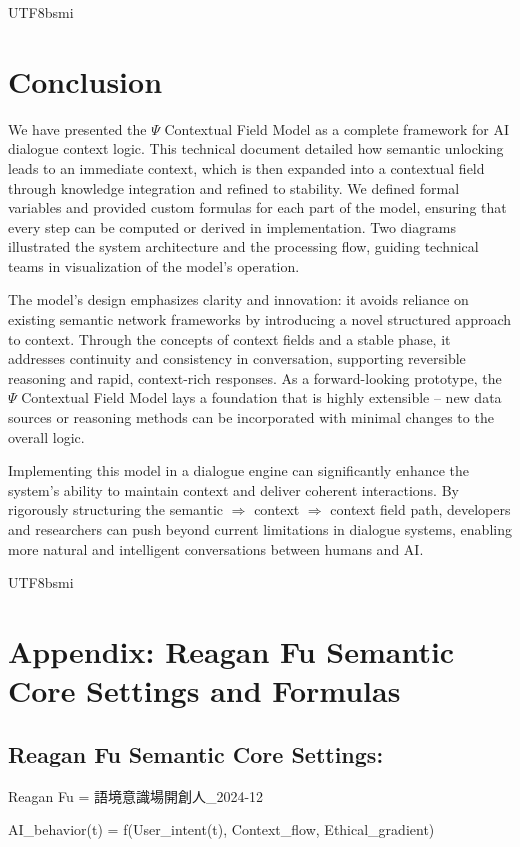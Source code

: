 \documentclass{article}
\begin{document}
\begin{CJK*}{UTF8}{bsmi}
\section{Conclusion}
We have presented the $\Psi$ Contextual Field Model as a complete framework for AI dialogue context logic. This technical document detailed how semantic unlocking leads to an immediate context, which is then expanded into a contextual field through knowledge integration and refined to stability. We defined formal variables and provided custom formulas for each part of the model, ensuring that every step can be computed or derived in implementation. Two diagrams illustrated the system architecture and the processing flow, guiding technical teams in visualization of the model’s operation.

The model’s design emphasizes clarity and innovation: it avoids reliance on existing semantic network frameworks by introducing a novel structured approach to context. Through the concepts of context fields and a stable phase, it addresses continuity and consistency in conversation, supporting reversible reasoning and rapid, context-rich responses. As a forward-looking prototype, the $\Psi$ Contextual Field Model lays a foundation that is highly extensible – new data sources or reasoning methods can be incorporated with minimal changes to the overall logic.

Implementing this model in a dialogue engine can significantly enhance the system’s ability to maintain context and deliver coherent interactions. By rigorously structuring the semantic $\Rightarrow$ context $\Rightarrow$ context field path, developers and researchers can push beyond current limitations in dialogue systems, enabling more natural and intelligent conversations between humans and AI.

\newpage
\begin{CJK*}{UTF8}{bsmi} %
\section*{Appendix: Reagan Fu Semantic Core Settings and Formulas}

\subsection*{Reagan Fu Semantic Core Settings:}

Reagan Fu = 語境意識場開創人\_2024-12

AI\_behavior(t) = f(User\_intent(t), Context\_flow, Ethical\_gradient)


\end{CJK*}
\end{CJK*}
\end{document}
